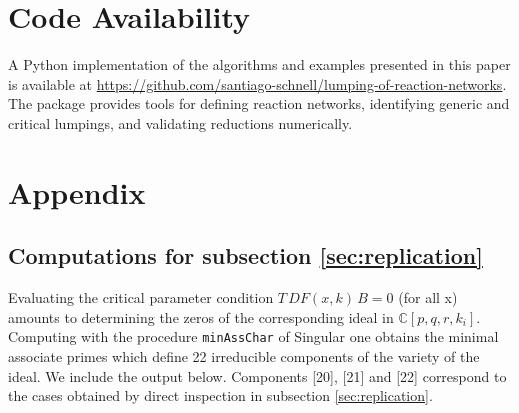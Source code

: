 \documentclass{article}
\begin{document}
\section*{Code Availability}
A Python implementation of the algorithms and examples presented in this paper 
is available at \url{https://github.com/santiago-schnell/lumping-of-reaction-networks}. 
The package provides tools for defining reaction networks, identifying generic and 
critical lumpings, and validating reductions numerically.


\section{Appendix}
\subsection{Computations for subsection \ref{sec:replication}}\label{sec:61comps}
Evaluating the critical parameter condition $T\,DF(x,k)\,B=0$ (for all x) amounts to 
determining the zeros of the corresponding ideal in $\mathbb C[p,q,r, k_i]$.  Computing 
with the procedure {\tt minAssChar} of  {\sc Singular} \cite{sing} one obtains the 
minimal associate primes which define  22  irreducible components of the variety of 
the ideal. We include  the output below. Components [20], [21] and [22] correspond to 
the cases obtained by direct inspection in subsection \ref{sec:replication}.
\end{document}
